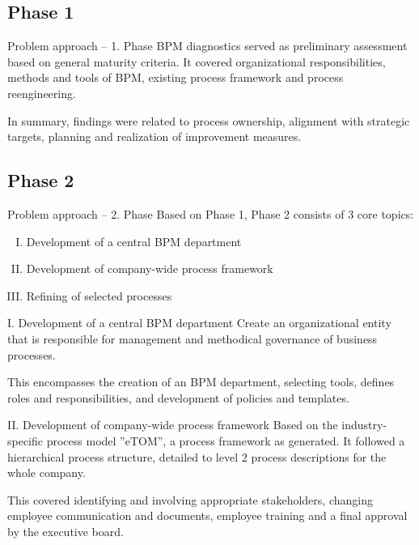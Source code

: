 \documentclass{beamer}
\begin{document}
\subsection{Phase 1}
\begin{frame}{Problem approach -- 1. Phase}
    BPM diagnostics served as preliminary assessment based on general maturity criteria.
    It covered organizational responsibilities, methods and tools of BPM, existing process framework and process reengineering.

    \vspace{1em}

    In summary, findings were related to process ownership, alignment with strategic targets, planning and realization of improvement measures.
\end{frame}


\subsection{Phase 2}
\begin{frame}{Problem approach -- 2. Phase}
    Based on Phase 1, Phase 2 consists of 3 core topics:
    \begin{enumerate}[I.]
        \item Development of a central BPM department\\
        \item Development of company-wide process framework\\
        \item Refining of selected processes\\
    \end{enumerate}
\end{frame}

\begin{frame}{I. Development of a central BPM department}
    Create an organizational entity that is responsible for management and methodical governance of business processes.

    \vspace{1em}

    This encompasses the creation of an BPM department, selecting tools, defines roles and responsibilities, and development of policies and templates.
\end{frame}

\begin{frame}{II. Development of company-wide process framework}
    Based on the industry-specific process model ''eTOM'', a process framework as generated.
    It followed a hierarchical process structure, detailed to level 2 process descriptions for the whole company.

    \vspace{1em}

    This covered identifying and involving appropriate stakeholders, changing employee communication and documents, employee training and a final approval by the executive board.

\end{frame}
\end{document}
